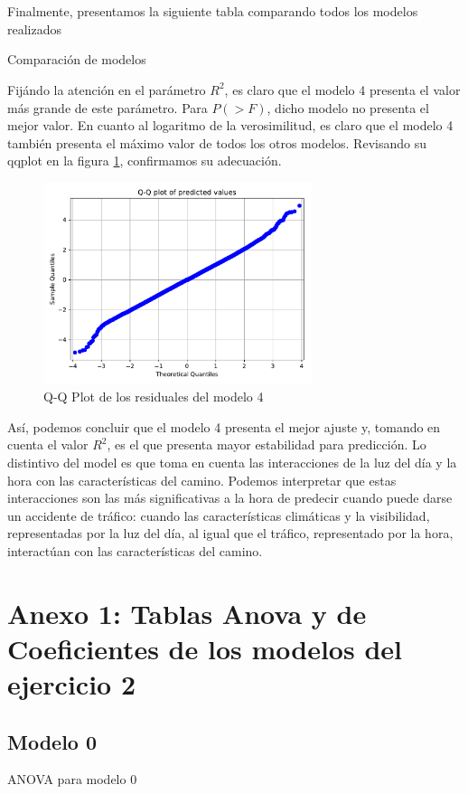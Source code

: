 \documentclass[11pt]{article}
\begin{document}
\\
\\Finalmente, presentamos la siguiente tabla comparando todos los modelos realizados
\begin{table}[H]
    \centering
    
    \caption{Comparación de modelos}
    \label{3-comparison}
\end{table}
Fijándo la atención en el parámetro $R^2$, es claro que el modelo 4 presenta el valor más grande de este parámetro. Para $P(> F)$, dicho modelo no presenta el mejor valor. En cuanto al logaritmo de la verosimilitud, es claro que el modelo 4 también presenta el máximo valor de todos los otros modelos. Revisando su qqplot en la figura \ref{qqplotok}, confirmamos su adecuación.
\begin{figure}[H]
    \centering
    \includegraphics[width = 0.7\textwidth]{3-qqplot4.pdf}
    \caption{Q-Q Plot de los residuales del modelo 4}
    \label{qqplotok}
\end{figure}
Así, podemos concluir que el modelo 4 presenta el mejor ajuste y, tomando en cuenta el valor $R^2$, es el que presenta mayor estabilidad para predicción. Lo distintivo del model es que toma en cuenta las interacciones de la luz del día y la hora con las características del camino. Podemos interpretar que estas interacciones son las más significativas a la hora de predecir cuando puede darse un accidente de tráfico: cuando las características climáticas y la visibilidad, representadas por la luz del día, al igual que el tráfico, representado por la hora, interactúan con las características del camino.
\pagebreak
\section*{Anexo 1: Tablas Anova y de Coeficientes de los modelos del ejercicio 2}
\subsection*{Modelo 0}

\begin{table}[H]
    \centering
    \caption{ANOVA para modelo 0}
    \label{3-mod0Anova}
\end{table}
\end{document}
